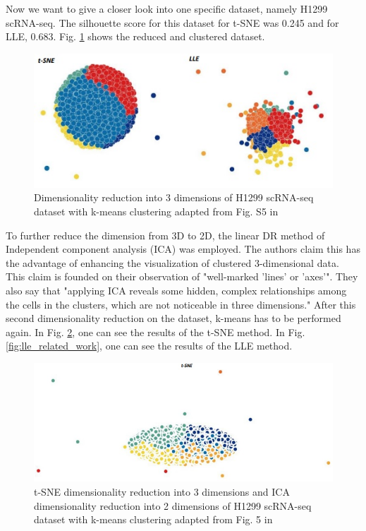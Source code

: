 Now we want to give a closer look into one specific dataset, namely H1299 scRNA-seq. The silhouette score for this dataset for t-SNE was 0.245 and for LLE, 0.683. Fig. \ref{fig:3d_related_work} shows the reduced and clustered dataset.
\begin{figure}[!]
	\centering
	\includegraphics[width=\columnwidth]{images/3d_related_work.jpg}
	\caption[Dimensionality reduction and k-means clustering]{Dimensionality reduction into 3 dimensions of H1299 scRNA-seq dataset with k-means clustering adapted from Fig. S5 in \cite{Vasighizaker22}}
    \label{fig:3d_related_work}
\end{figure}
To further reduce the dimension from 3D to 2D, the linear DR method of Independent component analysis (ICA) was employed. The authors claim this has the advantage of enhancing the visualization of clustered 3-dimensional data. This claim is founded on their observation of "well-marked 'lines' or 'axes'". They also say that "applying ICA reveals some hidden, complex relationships among the cells in the clusters, which are not noticeable in three dimensions." \cite{Vasighizaker22} After this second dimensionality reduction on the dataset, k-means has to be performed again. In Fig. \ref{fig:t-sne_related_work}, one can see the results of the t-SNE method. In Fig. \ref{fig:lle_related_work}, one can see the results of the LLE method.
\begin{figure}[!]
	\centering
	\includegraphics[width=\columnwidth]{images/t-sne_related_work.jpg}
	\caption[t-SNE dimensionality reduction and k-means clustering]{t-SNE dimensionality reduction into 3 dimensions and ICA dimensionality reduction into 2 dimensions of H1299 scRNA-seq dataset with k-means clustering adapted from Fig. 5 in \cite{Vasighizaker22}}
    \label{fig:t-sne_related_work}
\end{figure}
